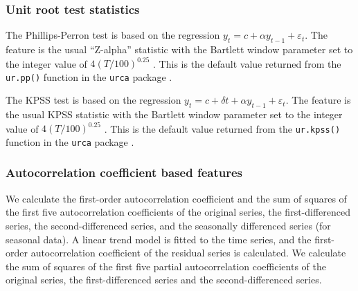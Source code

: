 \documentclass[11pt,a4paper,]{article}
\begin{document}
\hypertarget{unit-root-test-statistics}{%
\subsubsection*{Unit root test statistics}\label{unit-root-test-statistics}}

The Phillips-Perron test is based on the regression \(y_t= c + \alpha y_{t-1}+ \varepsilon_t\). The feature is the usual ``Z-alpha'' statistic with the Bartlett window parameter set to the integer value of \(4(T/100)^{0.25}\) \autocite{Pfaff2008}. This is the default value returned from the \texttt{ur.pp()} function in the \texttt{urca} package \autocite{pfaff2016package}.

The KPSS test is based on the regression \(y_t=c+\delta t+\alpha y_{t-1}+\varepsilon_t\). The feature is the usual KPSS statistic with the Bartlett window parameter set to the integer value of \(4(T/100)^{0.25}\) \autocite{Pfaff2008}. This is the default value returned from the \texttt{ur.kpss()} function in the \texttt{urca} package \autocite{pfaff2016package}.

\hypertarget{autocorrelation-coefficient-based-features}{%
\subsubsection*{Autocorrelation coefficient based features}\label{autocorrelation-coefficient-based-features}}

We calculate the first-order autocorrelation coefficient and the sum of squares of the first five autocorrelation coefficients of the original series, the first-differenced series, the second-differenced series, and the seasonally differenced series (for seasonal data). A linear trend model is fitted to the time series, and the first-order autocorrelation coefficient of the residual series is calculated. We calculate the sum of squares of the first five partial autocorrelation coefficients of the original series, the first-differenced series and the second-differenced series.

\clearpage

\printbibliography
\end{document}
